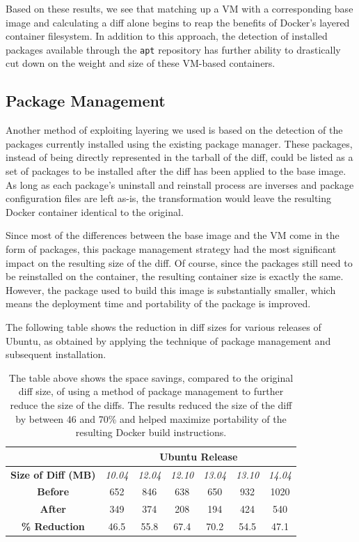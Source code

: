 \documentclass[\myfontsize, letterpaper]{article}
\begin{document}
Based on these results, we see that matching up a VM with a corresponding base image and calculating a diff alone begins to reap the benefits of Docker's layered container filesystem. In addition to this approach, the detection of installed packages available through the \texttt{apt} repository has further ability to drastically cut down on the weight and size of these VM-based containers.

\subsection{Package Management}

Another method of exploiting layering we used is based on the detection of the packages currently installed using the existing package manager. These packages, instead of being directly represented in the tarball of the diff, could be listed as a set of packages to be installed after the diff has been applied to the base image. As long as each package's uninstall and reinstall process are inverses and package configuration files are left as-is, the transformation would leave the resulting Docker container identical to the original.

Since most of the differences between the base image and the VM come in the form of packages, this package management strategy had the most significant impact on the resulting size of the diff. Of course, since the packages still need to be reinstalled on the container, the resulting container size is exactly the same. However, the package used to build this image is substantially smaller, which means the deployment time and portability of the package is improved.

The following table shows the reduction in diff sizes for various releases of Ubuntu, as obtained by applying the technique of package management and subsequent installation.

\begin{table}[h]
\centering
    \begin{tabular}{| c | c | c | c | c | c | c |}
    \hline
& \multicolumn{6}{|c|}{\bfseries Ubuntu Release} \\ \hline
    \bfseries Size of Diff (MB) & \itshape 10.04 & \itshape 12.04 & \itshape 12.10 & \itshape 13.04 & \itshape 13.10 & \itshape 14.04 \\ \hline
    \bfseries Before & 652 & 846 & 638 & 650 & 932 & 1020\\ \hline
    \bfseries After & 349 & 374 & 208 & 194 & 424 & 540  \\ \hline \hline
    \bfseries \% Reduction & 46.5 & 55.8 & 67.4 & 70.2 & 54.5 & 47.1\\
    \hline
    \end{tabular}
\caption{The table above shows the space savings, compared to the original diff size, of using a method of package management to further reduce the size of the diffs. The results reduced the size of the diff by between 46 and 70\%  and helped maximize portability of the resulting Docker build instructions.}
\label{table:diff}
\end{table}
\end{document}
